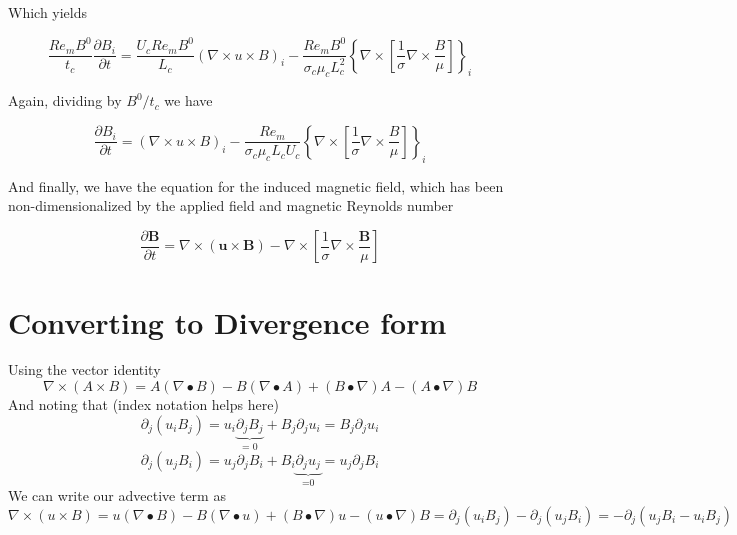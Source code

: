 \documentclass[11pt]{article}
\begin{document}
Which yields

\begin{equation}
	\frac{Re_m B^0}{t_c} 
	\frac{\partial B_i}{\partial t} 
	= 
	\frac{U_c Re_m B^0}{L_c}
	(\nabla \times u \times B)_i
	- 
	\frac{Re_m B^0}{\sigma_c \mu_c L_c^2}
	\left\{
	\nabla \times 
	\left[ \frac{1}{\sigma}
	\nabla \times \frac{B}{\mu} \right]
	\right\}_i
\end{equation}

Again, dividing by $B^0/t_c$ we have

\begin{equation}
	\frac{\partial B_i}{\partial t} 
	= 
	(\nabla \times u \times B)_i
	- 
	\frac{Re_m}{\sigma_c \mu_c L_c U_c}
	\left\{
	\nabla \times 
	\left[ \frac{1}{\sigma}
	\nabla \times \frac{B}{\mu} \right]
	\right\}_i
\end{equation}

And finally, we have the equation for the induced magnetic field, which has been non-dimensionalized by the applied field and magnetic Reynolds number

\begin{equation}
	\boxed{
	\frac{\partial \pmb{B}}{\partial t} 
	= 
	\nabla \times (\pmb{u} \times \pmb{B})
	- \nabla \times 
	\left[ \frac{1}{\sigma}
	\nabla \times \frac{\pmb{B}}{\mu} \right]
	}
\end{equation}


\section{Converting to Divergence form}

Using the vector identity
\begin{equation}
	\nabla \times (A\times B) = 
	A(\nabla \bullet B) 
	- B(\nabla \bullet A)
	+(B \bullet \nabla)A - (A \bullet \nabla)B
\end{equation}
And noting that (index notation helps here)
\begin{equation}
	\partial_j (u_i B_j) = 
	u_i \underbrace{\partial_j B_j}_\text{= 0} + B_j \partial_j u_i
	= B_j \partial_j u_i
\end{equation}
\begin{equation}
	\partial_j (u_j B_i) = 
	u_j \partial_j B_i + B_i \underbrace{\partial_j u_j}_\text{=0}
	= u_j \partial_j B_i
\end{equation}
We can write our advective term as
\begin{equation}
	\nabla \times (u \times B) 
	= u(\nabla \bullet B) 
	- B(\nabla \bullet u)
	+ (B \bullet \nabla)u
	- (u \bullet \nabla)B
	=
	\partial_j (u_i B_j) - \partial_j (u_j B_i)
	=
	-\partial_j (u_j B_i - u_i B_j)
\end{equation}
\end{document}
